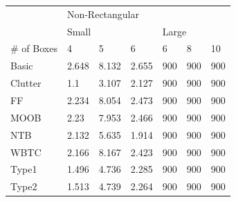 \documentclass[12pt,a4paper,oneside]{report}
\begin{document}
\begin{table}[]
\begin{tabular}{l|l|l|l|l|l|l|}
\cline{2-7}
                                  & \multicolumn{6}{l|}{Non-Rectangular}                             \\ \cline{2-7} 
                                  & \multicolumn{3}{l|}{Small} & \multicolumn{3}{l|}{Large} \\ \hline
\multicolumn{1}{|l|}{\# of Boxes} & 4       & 5       & 6      & 6       & 8       & 10     \\ \hline
\multicolumn{1}{|l|}{Basic}       & 2.648   & 8.132   & 2.655  & 900     & 900     & 900    \\ \hline
\multicolumn{1}{|l|}{Clutter}     & 1.1     & 3.107   & 2.127  & 900     & 900     & 900    \\ \hline
\multicolumn{1}{|l|}{FF}          & 2.234   & 8.054   & 2.473  & 900     & 900     & 900    \\ \hline
\multicolumn{1}{|l|}{MOOB}        & 2.23    & 7.953   & 2.466  & 900     & 900     & 900    \\ \hline
\multicolumn{1}{|l|}{NTB}         & 2.132   & 5.635   & 1.914  & 900     & 900     & 900    \\ \hline
\multicolumn{1}{|l|}{WBTC}        & 2.166   & 8.167   & 2.423  & 900     & 900     & 900    \\ \hline
\multicolumn{1}{|l|}{Type1}       & 1.496   & 4.736   & 2.285  & 900     & 900     & 900    \\ \hline
\multicolumn{1}{|l|}{Type2}       & 1.513   & 4.739   & 2.264  & 900     & 900     & 900    \\ \hline
\end{tabular}
\end{table}
\end{document}
